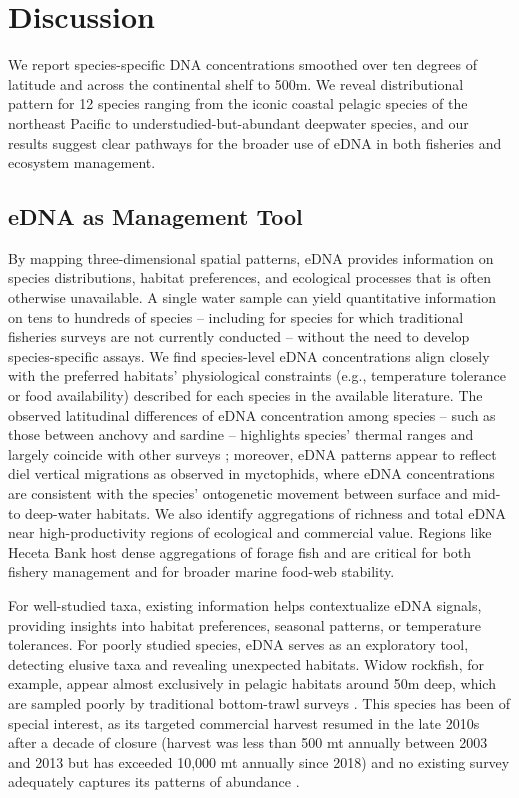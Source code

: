 \documentclass{article}
\begin{document}
\section{Discussion}
We report species-specific DNA concentrations smoothed over ten degrees of latitude and across the continental shelf to 500m. We reveal distributional pattern for 12 species ranging from the iconic coastal pelagic species of the northeast Pacific to understudied-but-abundant deepwater species, and our results suggest clear pathways for the broader use of eDNA in both fisheries and ecosystem management.

\subsection*{eDNA as Management Tool}
By mapping three-dimensional spatial patterns, eDNA provides information on species distributions, habitat preferences, and ecological processes that is often otherwise unavailable. A single water sample can yield quantitative information on tens to hundreds of species -- including for species for which traditional fisheries surveys are not currently conducted -- without the need to develop species-specific assays. We find species-level eDNA concentrations align closely with the preferred habitats' physiological constraints (e.g., temperature tolerance or food availability) described for each species in the available literature. The observed latitudinal differences of eDNA concentration among species – such as those between anchovy and sardine – highlights species’ thermal ranges and largely coincide with other surveys \cite{zwolinski2024}; moreover, eDNA patterns appear to reflect diel vertical migrations as observed in myctophids, where eDNA concentrations are consistent with the species’ ontogenetic movement between surface and mid- to deep-water habitats. We also identify aggregations of richness and total eDNA near high-productivity regions of ecological and commercial value. Regions like Heceta Bank host dense aggregations of forage fish and are critical for both fishery management and for broader marine food-web stability. 

For well-studied taxa, existing information helps contextualize eDNA signals, providing insights into habitat preferences, seasonal patterns, or temperature tolerances. For poorly studied species, eDNA serves as an exploratory tool, detecting elusive taxa and revealing unexpected habitats. Widow rockfish, for example, appear almost exclusively in pelagic habitats around 50m deep, which are sampled poorly by traditional bottom-trawl surveys \cite{keller2017}. This species has been of special interest, as its targeted commercial harvest resumed in the late 2010s after a decade of closure (harvest was less than 500 mt annually between 2003 and 2013 but has exceeded 10,000 mt annually since 2018) and no existing survey adequately captures its patterns of abundance \cite{adams2019a}.
\end{document}
